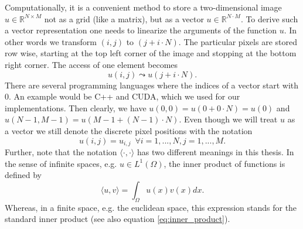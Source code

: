     Computationally, it is a convenient method to store a two-dimensional image $u \in \mathbb{R}^{N \times M}$ not as a grid (like a matrix), but as a vector $u \in \mathbb{R}^{N \cdot M}$. To derive such a vector representation one needs to linearize the arguments of the function $u$. In other words we transform $(i, j)$ to $(j + i \cdot N)$. %
    The particular pixels are stored row wise, starting at the top left corner of the image and stopping at the bottom right corner. The access of one element becomes
        $$
            u(i, j) \leadsto u(j + i \cdot N).
        $$
    There are several programming languages where the indices of a vector start with $0$. An example would be C++ and CUDA, which we used for our implementations. Then clearly, we have $u(0, 0) = u(0 + 0 \cdot N) = u(0)$ and $u(N-1, M-1) = u(M-1 + (N-1) \cdot N)$. Even though we will treat $u$ as a vector we still denote the discrete pixel positions with the notation
        $$
            u(i, j) = u_{i, j} \,\,\, \forall i = 1, ..., N, j = 1, ..., M.
        $$
    Further, note that the notation $\langle \cdot, \cdot \rangle$ has two different meanings in this thesis. In the sense of infinite spaces, e.g. $u \in L^{1}(\Omega)$, the inner product of functions is defined by
        $$
            \langle u, v \rangle = \int_{\Omega} u(x)v(x) dx.
        $$
    Whereas, in a finite space, e.g. the euclidean space, this expression stands for the standard inner product (see also equation \ref{eq:inner_product}).

